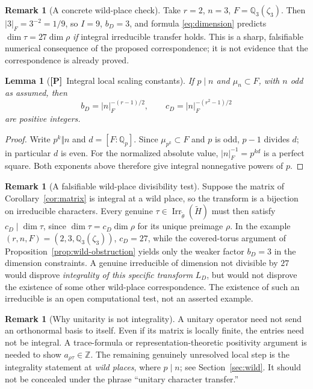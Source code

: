 \documentclass[11pt]{article}
\newcommand{\Irr}{\operatorname{Irr}}
\newcommand{\tH}{\widetilde H}
\newcommand{\Ptag}{\textnormal{\textbf{[P]}}}
\theoremstyle{plain}
\newtheorem{lemma}[theorem]{Lemma}
\theoremstyle{definition}
\newtheorem{remark}[theorem]{Remark}
\begin{document}
\begin{remark}[A concrete wild-place check]
Take $r=2$, $n=3$, $F=\mathbb Q_3(\zeta_3)$. Then $|3|_F=3^{-2}=1/9$, so $I=9$, $b_D=3$, and formula \eqref{eq:dimension} predicts $\dim\tau=27\dim\rho$ \emph{if} integral irreducible transfer holds. This is a sharp, falsifiable numerical consequence of the proposed correspondence; it is not evidence that the correspondence is already proved.
\end{remark}


\begin{lemma}[\Ptag\ Integral local scaling constants]\label{lem:integral-constants}
If $p\mid n$ and $\mu_n\subset F$, with $n$ odd as assumed, then
\[
b_D=|n|_F^{-(r-1)/2},\qquad
c_D=|n|_F^{-(r^2-1)/2}
\]
are positive integers.
\end{lemma}
\begin{proof}
Write $p^k\Vert n$ and $d=[F:\mathbb Q_p]$. Since
$\mu_{p^k}\subset F$ and $p$ is odd, $p-1$ divides $d$;
in particular $d$ is even. For the normalized absolute value,
$|n|_F^{-1}=p^{kd}$ is a perfect square. Both exponents above
therefore give integral nonnegative powers of $p$.
\end{proof}

\begin{remark}[A falsifiable wild-place divisibility test]\label{rem:wild-test}
Suppose the matrix of Corollary~\ref{cor:matrix} is integral at a
wild place, so the transform is a bijection on irreducible characters.
Every genuine $\tau\in\Irr_{\widetilde\theta}(\tH)$ must then satisfy
$c_D\mid\dim\tau$, since $\dim\tau=c_D\dim\rho$ for its unique
preimage $\rho$. In the example $(r,n,F)=(2,3,\mathbb Q_3(\zeta_3))$,
$c_D=27$, while the covered-torus argument of
Proposition~\ref{prop:wild-obstruction} yields only the weaker
factor $b_D=3$ in the dimension constraints. A genuine irreducible
of dimension not divisible by $27$ would disprove \emph{integrality
of this specific transform} $L_D$, but would not disprove the existence
of some other wild-place correspondence. The existence of such an
irreducible is an open computational test, not an asserted example.
\end{remark}

\begin{remark}[Why unitarity is not integrality]\label{rem:warning}
A unitary operator need not send an orthonormal basis to itself. Even if its matrix is locally finite, the entries need not be integral. A trace-formula or representation-theoretic positivity argument is needed to show $a_{\rho\tau}\in\mathbb Z$. The remaining genuinely unresolved local step is the integrality statement at \emph{wild places}, where $p\mid n$; see Section~\ref{sec:wild}. It should not be concealed under the phrase ``unitary character transfer.''
\end{remark}
\end{document}
